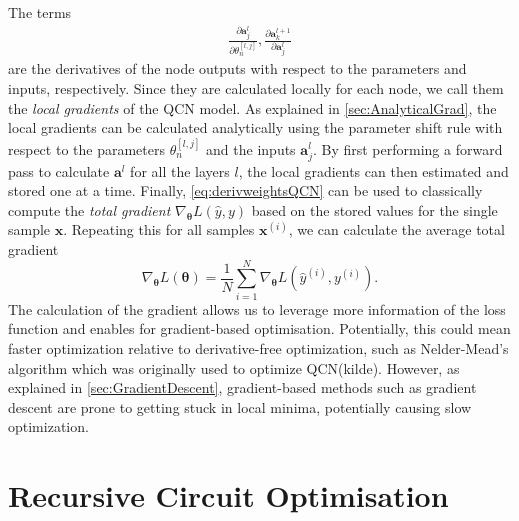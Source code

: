 The terms 
\begin{equation}\label{eq:localGradients}
\begin{aligned}
    \frac{\partial \boldsymbol{a}^{l}_j}{\partial \theta^{[l,j]}_n}, \frac{\partial \boldsymbol{a}^{l+1}_k}{\partial \boldsymbol{a}^{l}_j}
\end{aligned}
\end{equation} are the derivatives of the node outputs with respect to the parameters and inputs, respectively. Since they are calculated locally for each node, we call them the \emph{local gradients} of the QCN model. As explained in \autoref{sec:AnalyticalGrad}, the local gradients can be calculated analytically using the parameter shift rule with respect to the parameters $\theta^{[l,j]}_n$ and the inputs $\boldsymbol{a}^{l}_j$. By first performing a forward pass to calculate $\boldsymbol{a}^{l}$ for all the layers $l$, the local gradients can then estimated and stored one at a time. Finally, \autoref{eq:derivweightsQCN} can be used to classically compute the \emph{total gradient} $\nabla_{\boldsymbol{\theta}} L(\hat{y},y)$ based on the stored values for the single sample $\boldsymbol{x}$. Repeating this for all samples $\boldsymbol{x}^{(i)}$, we can calculate the average total gradient \begin{equation}\label{eq:averageGradientQCN}
    \nabla_{\boldsymbol{\theta}} L(\boldsymbol{\theta}) = \frac{1}{N}\sum_{i=1}^N \nabla_{\boldsymbol{\theta}} L(\hat{y}^{(i)}, y^{(i)}).
\end{equation}  The calculation of the gradient allows us to leverage more information of the loss function and enables for gradient-based optimisation. Potentially, this could mean faster optimization relative to derivative-free optimization, such as Nelder-Mead's algorithm which was originally used to optimize QCN(kilde). However, as explained in \autoref{sec:GradientDescent}, gradient-based methods such as gradient descent are prone to getting stuck in local minima, potentially causing slow optimization.    

\section{Recursive Circuit Optimisation}\label{sec:RCO}


